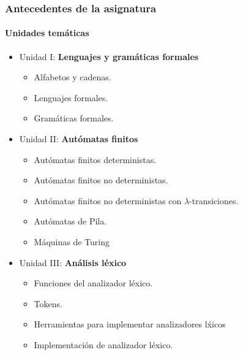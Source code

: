 \documentclass{beamer}
\begin{document}
        \begin{frame}
            \frametitle{Antecedentes de la asignatura}
            \framesubtitle{Unidades tem\'aticas}

            \begin{itemize}
                \item Unidad I: \textbf{Lenguajes y gram\'aticas formales}
                \begin{itemize}
                    \item Alfabetos y cadenas.
                    \item Lenguajes formales.
                    \item Gram\'aticas formales.
                \end{itemize}
                \item Unidad II: \textbf{Aut\'omatas finitos}
                \begin{itemize}
                    \item Aut\'omatas finitos deterministas.
                    \item Aut\'omatas finitos no deterministas.
                    \item Aut\'omatas finitos no deterministas con $\lambda$-transiciones.
                    \item Aut\'omatas de Pila.
                    \item M\'aquinas de Turing
                \end{itemize}
                \item Unidad III: \textbf{An\'alisis l\'exico}
                \begin{itemize}
                    \item Funciones del analizador l\'exico.
                    \item Tokens.
                    \item Herramientas para implementar analizadores l\'xicos
                    \item Implementaci\'on de analizador l\'exico.
                \end{itemize}
            \end{itemize}
        \end{frame}
\end{document}
